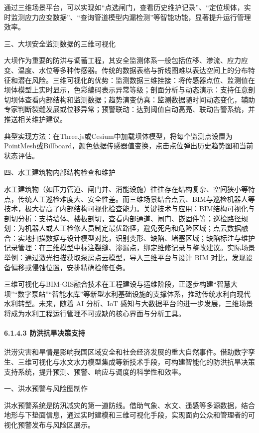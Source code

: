通过三维场景平台，可以实现如``点选闸门，查看历史维护记录''、``定位坝体，实时监测应力应变数据''、``查询管道模型内漏检测''等智能功能，显著提升运行管理效率。

三、大坝安全监测数据的三维可视化

大坝作为重要的防洪与调蓄工程，其安全监测体系一般包括位移、渗流、应力应变、温度、水位等多种传感器。传统的数据表格与折线图难以表达空间上的分布特征和潜在风险。三维可视化的优势：监测数据三维挂接：将传感器点位、监测值在坝体模型上实时显示，色彩编码表示异常等级；剖面分析与动态演示：支持任意剖切坝体查看内部结构和监测数据；趋势演变仿真：监测数据随时间动态变化，辅助专家判断裂缝发展或位移异常；预警联动：达到阈值自动高亮、联动告警系统，并推送相关维护建议。

典型实现方法：在Three.js或Cesium中加载坝体模型，将每个监测点设置为PointMesh或Billboard，颜色依据传感器值变换，点击点位弹出历史趋势图和当前状态评估。

四、水工建筑物内部结构检查和维护

水工建筑物（如压力管道、闸门井、消能设施）往往存在结构复杂、空间狭小等特点，传统人工巡检难度大、安全性差。而三维场景结合点云、BIM与巡检机器人等技术，极大提高了内部结构可视化检查能力。关键技术与应用：BIM结构可视化与剖切分析：支持墙体、楼板剖切，查看内部通道、闸门、嵌固件等；巡检路径规划：为机器人或人工检修人员制定最优路径，避免死角和危险区域；点云数据融合：实地扫描数据与设计模型对比，识别变形、缺陷、堵塞区域；缺陷标注与维护记录管理：在三维模型中标注裂缝、渗漏点，绑定维修记录与整改建议。实际场景举例：通过激光扫描获取泵房点云模型，导入三维平台与设计 BIM 对比，发现设备偏移或侵蚀位置，安排精确检修任务。

三维可视化与BIM-GIS融合技术在工程建设与运维阶段，正逐步构建``智慧大坝''``数字泵站''``智能水库''等新型水利基础设施的支撑体系，推动传统水利向现代水利转型。未来，随着 AI 分析、IoT 感知与大数据平台的进一步发展，三维场景将成为水利工程运行管理不可或缺的核心界面与分析工具。

\paragraph{6.1.4.3 防洪抗旱决策支持}\label{ux9632ux6d2aux6297ux65f1ux51b3ux7b56ux652fux6301}

洪涝灾害和旱情是影响我国区域安全和社会经济发展的重大自然事件。借助数字孪生、三维可视化与水文水力模型集成等新技术手段，可构建智能化的防洪抗旱决策支持系统，提升预测、预警、响应与调度的科学性和效率。

一、洪水预警与风险图制作

洪水预警系统是防汛减灾的第一道防线。借助气象、水文、遥感等多源数据，结合地形与下垫面信息，通过实时建模和三维可视化手段，实现面向公众和管理者的可视化预警发布与风险区展示。

